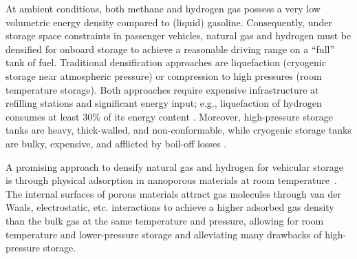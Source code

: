 At ambient conditions, both methane
and hydrogen gas
possess a very low volumetric energy density compared to (liquid) gasoline.
Consequently, under storage space constraints in passenger vehicles, natural gas and hydrogen must be densified for onboard storage to achieve a reasonable driving range on a ``full'' tank of fuel. Traditional densification approaches are liquefaction (cryogenic storage near atmospheric pressure)
or compression to high pressures (room temperature storage).
Both approaches require expensive infrastructure at refilling stations and significant energy input; e.g., liquefaction of hydrogen consumes at least 30\% of its energy content \cite{bossel2003energy}. Moreover, high-pressure storage tanks are heavy, thick-walled, and non-conformable, while cryogenic storage tanks are bulky, expensive, and afflicted by boil-off losses \cite{hasan2009minimizing}.

A promising approach to densify natural gas \cite{makal2012methane,mason2014evaluating} and hydrogen \cite{suh2011hydrogen,garcia2018benchmark} for vehicular storage is through physical adsorption in nanoporous materials at room temperature~\cite{schoedel2016role}. The internal surfaces of porous materials attract gas molecules through van der Waals, electrostatic, etc. interactions to achieve a higher adsorbed gas density than the bulk gas at the same temperature and pressure, allowing for room temperature and lower-pressure storage and alleviating many drawbacks of high-pressure storage.

